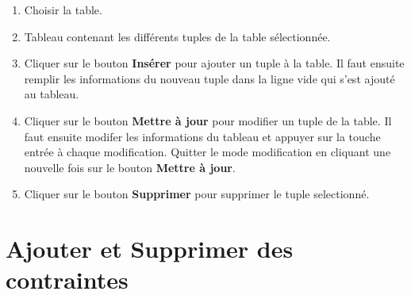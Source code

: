 \begin{enumerate}
\item Choisir la table.
\item Tableau contenant les différents tuples de la table sélectionnée.
\item Cliquer sur le bouton \textbf{Insérer} pour ajouter un tuple à la table. Il faut ensuite remplir les informations du nouveau tuple
dans la ligne vide qui s'est ajouté au tableau.
\item Cliquer sur le bouton \textbf{Mettre à jour} pour modifier un tuple de la table. Il faut ensuite modifer les informations du tableau et 
appuyer sur la touche entrée à chaque modification. Quitter le mode modification en cliquant une nouvelle fois sur le bouton \textbf{Mettre à jour}.
\item Cliquer sur le bouton \textbf{Supprimer} pour supprimer le tuple selectionné.
\end{enumerate}

\section{Ajouter et Supprimer des contraintes}
